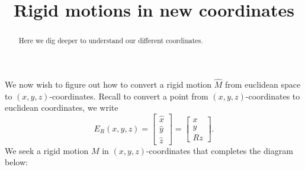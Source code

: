 \documentclass[newpage,hints,handout,noauthor,nooutcomes,12pt]{ximera}
\title{Rigid motions in new coordinates}
\begin{document}
\begin{abstract}
  Here we dig deeper to understand our different coordinates.
\end{abstract}
\maketitle

We now wish to figure out how to convert a rigid motion $\hat M$ from
euclidean space to $(x,y,z)$-coordinates. Recall to convert a point
from $(x,y,z)$-coordinates to euclidean coordinates, we write
\[
E_R(x,y,z)=
\begin{bmatrix}
\hat{x} \\ \hat{y} \\ \hat{z}%
\end{bmatrix}
=\begin{bmatrix}
  x \\ y \\ Rz
\end{bmatrix}.
\]
We seek a rigid motion $M$ in $(x,y,z)$-coordinates that completes the diagram below:
\begin{center}
\end{center}
\end{document}
